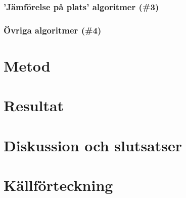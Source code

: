 \documentclass[a4]{article}
\begin{document}
\subsubsection{'Jämförelse på plats' algoritmer (\#3)}

\subsubsection{Övriga algoritmer (\#4)}

\section{Metod}

\section{Resultat}

\section{Diskussion och slutsatser}

\onecolumn
\newpage
\section{Källförteckning}
\printbibliography
\end{document}

